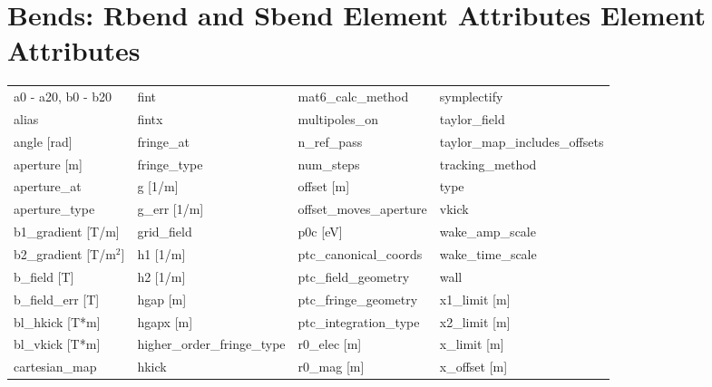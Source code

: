  \section{Bends: Rbend and Sbend Element Attributes Element Attributes}
 \label{s:list.bend}
 
 \begin{tabular}{llll} \toprule
a0 - a20, b0 - b20             & fint                           & mat6_calc_method               & symplectify                    \\
alias                          & fintx                          & multipoles_on                  & taylor_field                   \\
angle [rad]                    & fringe_at                      & n_ref_pass                     & taylor_map_includes_offsets    \\
aperture [m]                   & fringe_type                    & num_steps                      & tracking_method                \\
aperture_at                    & g [1/m]                        & offset [m]                     & type                           \\
aperture_type                  & g_err [1/m]                    & offset_moves_aperture          & vkick                          \\
b1_gradient [T/m]              & grid_field                     & p0c [eV]                       & wake_amp_scale                 \\
b2_gradient [T/m$^2$]          & h1 [1/m]                       & ptc_canonical_coords           & wake_time_scale                \\
b_field [T]                    & h2 [1/m]                       & ptc_field_geometry             & wall                           \\
b_field_err [T]                & hgap [m]                       & ptc_fringe_geometry            & x1_limit [m]                   \\
bl_hkick [T*m]                 & hgapx [m]                      & ptc_integration_type           & x2_limit [m]                   \\
bl_vkick [T*m]                 & higher_order_fringe_type       & r0_elec [m]                    & x_limit [m]                    \\
cartesian_map                  & hkick                          & r0_mag [m]                     & x_offset [m]                   \\

\end{tabular}
